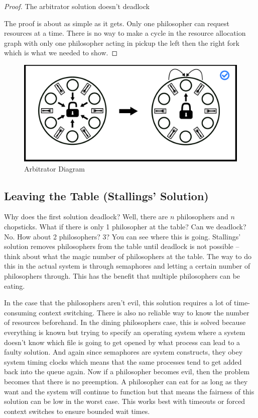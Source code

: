 \begin{proof} The arbitrator solution doesn't deadlock
	
	The proof is about as simple as it gets. Only one philosopher can request resources at a time. There is no way to make a cycle in the resource allocation graph with only one philosopher acting in pickup the left then the right fork which is what we needed to show.
	
\end{proof}

\begin{figure}[H]
	\centering
	\includegraphics[width=.9\textwidth]{deadlock/drawings/dining_arbitrator.eps}
	\caption{Arbitrator Diagram}
\end{figure}

\subsection{Leaving the Table (Stallings' Solution)}

Why does the first solution deadlock?
Well, there are $n$ philosophers and $n$ chopsticks.
What if there is only 1 philosopher at the table?
Can we deadlock?
No.
How about 2 philosophers?
3?
You can see where this is going.
Stallings' \cite[P. 280]{stalling} solution removes philosophers from the table until deadlock is not possible -- think about what the magic number of philosophers at the table.
The way to do this in the actual system is through semaphores and letting a certain number of philosophers through.
This has the benefit that multiple philosophers can be eating.

In the case that the philosophers aren't evil, this solution requires a lot of time-consuming context switching.
There is also no reliable way to know the number of resources beforehand.
In the dining philosophers case, this is solved because everything is known but trying to specify an operating system where a system doesn't know which file is going to get opened by what process can lead to a faulty solution.
And again since semaphores are system constructs, they obey system timing clocks which means that the same processes tend to get added back into the queue again.
Now if a philosopher becomes evil, then the problem becomes that there is no preemption.
A philosopher can eat for as long as they want and the system will continue to function but that means the fairness of this solution can be low in the worst case.
This works best with timeouts or forced context switches to ensure bounded wait times.

